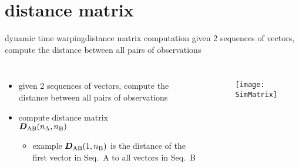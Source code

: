     \section[distance]{distance matrix}
        \begin{frame}{dynamic time warping}{distance matrix computation}
            given 2 sequences of vectors, compute the distance between all pairs of observations
            \begin{columns}
                \begin{itemize}
                    \item   given 2 sequences of vectors, compute the distance between all pairs of observations
                    \smallskip
                    \item<1->	compute distance matrix\\ $\mat{D}_{\mathrm{AB}}(n_\mathrm{A},n_\mathrm{B})$
                    \smallskip
                        \begin{itemize}
                            \item   example  $\mat{D}_{\mathrm{AB}}(1,n_\mathrm{B})$ is the distance of the first vector in Seq.\ A to all vectors in Seq.\ B
                        \end{itemize}
                \end{itemize}
                \begin{figure}
                    \texttt{[image: SimMatrix]}
                \end{figure}
            \end{columns}
        \end{frame}
